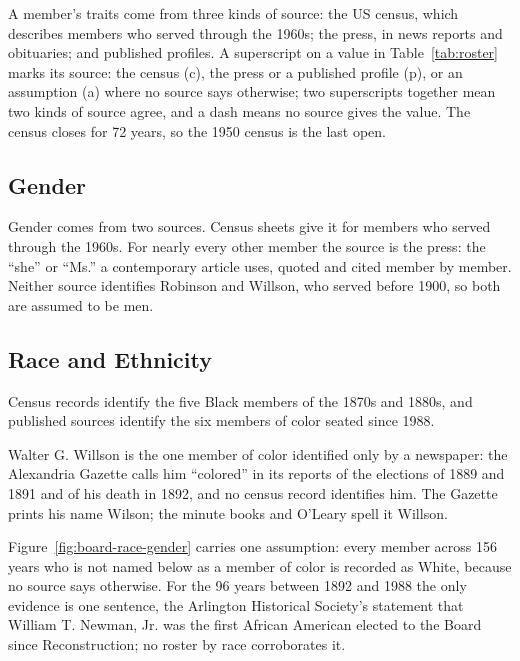 A member's traits come from three kinds of source: the US census, which
describes members who served through the 1960s; the press, in news reports and
obituaries; and published profiles. A superscript on a value in Table~\ref{tab:roster}
marks its source: the census (c), the press or a published profile (p), or an
assumption (a) where no source says otherwise; two superscripts together mean
two kinds of source agree, and a dash means no source gives the value. The
census closes for 72 years, so the 1950 census is the last open.

\subsection{Gender}
Gender comes from two sources. Census sheets give it for members who served
through the 1960s. For nearly every other member the source is the press: the
``she'' or ``Ms.'' a contemporary article uses, quoted and cited member by
member. Neither source identifies Robinson and Willson, who served before 1900,
so both are assumed to be men.

\subsection{Race and Ethnicity}
Census records identify the five Black members of the 1870s and 1880s, and published
sources identify the six members of color seated since 1988.

Walter G. Willson is the one member of color identified only by a newspaper: the Alexandria
Gazette calls him ``colored'' in its reports of the elections of 1889 and 1891 and of his death in
1892, and no census record identifies him. The Gazette prints his name Wilson; the minute books and
O'Leary spell it Willson.\autocite{alexandriagazette18890525p3,alexandriagazette18910529p3,gazette1892wilsondeath}

Figure~\ref{fig:board-race-gender} carries one assumption: every member across 156 years
who is not named below as a member of color is recorded as White, because no source
says otherwise. For the 96 years between 1892 and 1988 the only evidence is one
sentence, the Arlington Historical Society's statement that William T. Newman,
Jr. was the first African American elected to the Board since Reconstruction;
no roster by race corroborates it.

